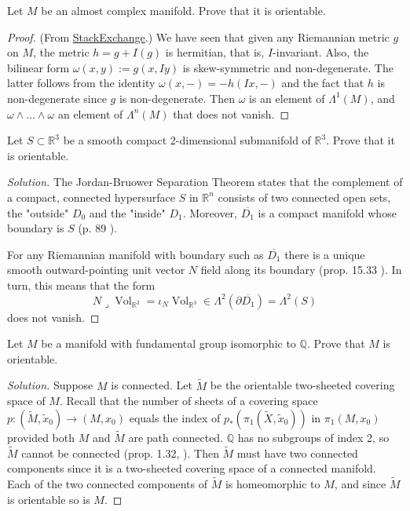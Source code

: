 \documentclass{article}
\newcommand{\R}{\mathbb{R}}
\newcommand{\Q}{\mathbb{Q}}
\DeclareMathOperator{\Vol}{Vol}
\begin{document}
\begin{exercise}
	 Let $M$ be an almost complex manifold. Prove that it is
	orientable.
\end{exercise}
\begin{proof}
	(From \href{https://math.stackexchange.com/questions/1817959/almost-complex-manifolds-are-orientable}{StackExchange}.) We have seen that given any Riemannian metric $g$ on $M$, the metric $h=g+I(g)$ is hermitian, that is, $I$-invariant. Also, the bilinear form $\omega(x,y):=g(x,Iy)$ is skew-symmetric and non-degenerate. The latter follows from the identity $\omega(x,-)=-h(Ix,-)$ and the fact that $h$ is non-degenerate since $g$ is non-degenerate. Then $\omega$ is an element of $\Lambda^1(M)$, and $\omega\wedge\ldots\wedge\omega$ an element of $\Lambda^n(M)$ that does not vanish.
\end{proof}
\begin{exercise}
	Let $S \subset \R^3$ be a smooth compact 2-dimensional submanifold of $\R^3$. Prove that it is orientable.
\end{exercise}
\begin{proof}[Solution]
	
	The Jordan-Bruower Separation Theorem states that the complement of a compact, connected hypersurface $S$ in $\R^n$ consists of two connected open sets, the "outside" $D_0$ and the "inside"  $D_1$. Moreover, $\overline{D_1}$ is a compact manifold whose boundary is $S$ (p. 89 \cite{guillemin}).
	
	For any Riemannian manifold with boundary such as $\overline{D_1}$ there is a unique smooth outward-pointing unit vector $N$ field along its boundary (prop. 15.33 \cite{lee}). In turn, this means that the form 
	\[N\lrcorner\Vol_{\R^3}=\iota_N\Vol_{\R^3}\in\Lambda^2(\partial\overline{D_1})=\Lambda^2(S)\]
	does not vanish.
\end{proof}
\begin{exercise}
	Let $M$ be a manifold with fundamental group isomorphic to $\Q$. Prove that $M$ is orientable.
\end{exercise}
\begin{proof}[Solution]
	Suppose $M$ is connected. Let $\tilde{M}$ be the orientable two-sheeted covering space of $M$. Recall that the number of sheets of a covering space $p:(\tilde{M},\tilde{x}_0)\to(M,x_0)$ equals the index of $p_*(\pi_1(\tilde{X},\tilde{x}_0))$ in $\pi_1(M,x_0)$ provided both $M$ and $\tilde{M}$ are path connected. $\Q$ has no subgroups of index 2, so $\tilde{M}$ cannot be connected (prop. 1.32, \cite{hatcher}). Then $\tilde{M}$ must have two connected components since it is a two-sheeted covering space of a connected manifold. Each of the two connected components of $\tilde{M}$ is homeomorphic to $M$, and since $\tilde{M}$ is orientable so is $M$.
\end{proof}
\end{document}
